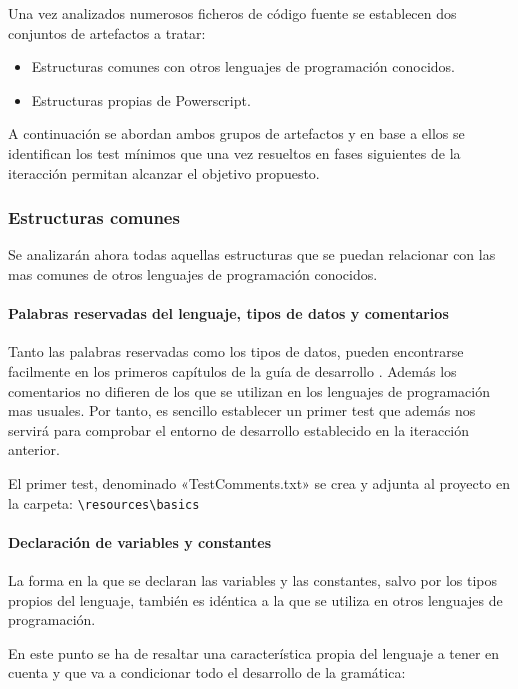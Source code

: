 Una vez analizados numerosos ficheros de código fuente se establecen dos conjuntos de artefactos a tratar:

\begin{itemize}
 \item Estructuras comunes con otros lenguajes de programación conocidos.
 \item Estructuras propias de Powerscript.
\end{itemize}

A continuación se abordan ambos grupos de artefactos y en base a ellos se identifican los test mínimos que una vez resueltos
en fases siguientes de la iteracción permitan alcanzar el objetivo propuesto.

\subsubsection{Estructuras comunes} \label{subsec:EstructurasComunes}

Se analizarán ahora todas aquellas estructuras que se puedan relacionar con las mas comunes de otros lenguajes de programación conocidos.

\paragraph{Palabras reservadas del lenguaje, tipos de datos y comentarios}
Tanto las palabras reservadas como los tipos de datos, pueden encontrarse facilmente en los primeros capítulos de la guía de desarrollo \cite{PowerBuilder}.
Además los comentarios no difieren de los que se utilizan en los lenguajes de programación mas usuales. Por tanto, es sencillo establecer un primer test
que además nos servirá para comprobar el entorno de desarrollo establecido en la iteracción anterior. 

El primer test, denominado «TestComments.txt» se crea y adjunta al proyecto en la carpeta: \verb|\resources\basics|

\paragraph{Declaración de variables y constantes}
La forma en la que se declaran las variables y las constantes, salvo por los tipos propios del lenguaje, también es idéntica a la que se utiliza en otros 
lenguajes de programación. 

En este punto se ha de resaltar una característica propia del lenguaje a tener en cuenta y que va a condicionar todo el desarrollo de la gramática: 

